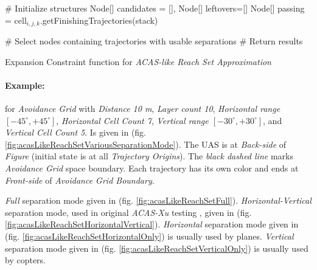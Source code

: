 \begin{algorithm}[H]
    
    \BlankLine
    \# Initialize structures\;
    Node[] candidates = [], Node[] leftovers=[]\;
    Node[] passing = cell$_{i,j,k}$.getFinishingTrajectories(stack)\;
    
    \BlankLine
    \# Select nodes containing trajectories with usable separations\;
    \BlankLine
    \# Return results\;
    
    \caption{Expansion Constraint function for \emph{ACAS-like Reach Set Approximation}}
    \label{alg:ExpansionConstraintFunctionForACASLikeReachSet}    
\end{algorithm}

\paragraph{Example:} for \emph{Avoidance Grid} with \emph{Distance 10 m}, \emph{Layer count 10}, \emph{Horizontal range $[-45^\circ,+45^\circ]$}, \emph{Horizontal Cell Count 7}, \emph{Vertical range $[-30^\circ,+30^\circ]$}, and \emph{Vertical Cell Count 5}. Is given in (fig. \ref{fig:acasLikeReachSetVariousSeparationMode}). The UAS is at \emph{Back-side} of \emph{Figure} (initial state is at all \emph{Trajectory Origins}). The \emph{black dashed line} marks \emph{Avoidance Grid} space boundary. Each trajectory has its own color and ends at \emph{Front-side} of \emph{Avoidance Grid Boundary}.

\emph{Full} separation mode given in (fig. \ref{fig:acasLikeReachSetFull}). \emph{Horizontal-Vertical} separation mode, used in original \emph{ACAS-Xu} testing \cite{marston2015acas}, given in (fig. \ref{fig:acasLikeReachSetHorizontalVertical}). \emph{Horizontal} separation mode given in (fig. \ref{fig:acasLikeReachSetHorizontalOnly}) is usually used by planes. \emph{Vertical} separation mode given in (fig. \ref{fig:acasLikeReachSetVerticalOnly}) is usually used by copters.

